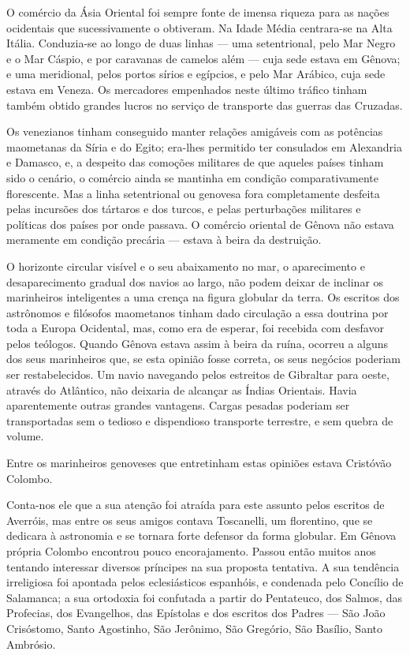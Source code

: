 \documentclass[11pt,a5paper,twoside,openany]{book}
\begin{document}
O comércio da Ásia Oriental foi sempre fonte de imensa riqueza para as nações ocidentais que sucessivamente o obtiveram. Na Idade Média centrara-se na Alta Itália. Conduzia-se ao longo de duas linhas — uma setentrional, pelo Mar Negro e o Mar Cáspio, e por caravanas de camelos além — cuja sede estava em Gênova; e uma meridional, pelos portos sírios e egípcios, e pelo Mar Arábico, cuja sede estava em Veneza. Os mercadores empenhados neste último tráfico tinham também obtido grandes lucros no serviço de transporte das guerras das Cruzadas.

Os venezianos tinham conseguido manter relações amigáveis com as potências maometanas da Síria e do Egito; era-lhes permitido ter consulados em Alexandria e Damasco, e, a despeito das comoções militares de que aqueles países tinham sido o cenário, o comércio ainda se mantinha em condição comparativamente florescente. Mas a linha setentrional ou genovesa fora completamente desfeita pelas incursões dos tártaros e dos turcos, e pelas perturbações militares e políticas dos países por onde passava. O comércio oriental de Gênova não estava meramente em condição precária — estava à beira da destruição.

O horizonte circular visível e o seu abaixamento no mar, o aparecimento e desaparecimento gradual dos navios ao largo, não podem deixar de inclinar os marinheiros inteligentes a uma crença na figura globular da terra. Os escritos dos astrônomos e filósofos maometanos tinham dado circulação a essa doutrina por toda a Europa Ocidental, mas, como era de esperar, foi recebida com desfavor pelos teólogos. Quando Gênova estava assim à beira da ruína, ocorreu a alguns dos seus marinheiros que, se esta opinião fosse correta, os seus negócios poderiam ser restabelecidos. Um navio navegando pelos estreitos de Gibraltar para oeste, através do Atlântico, não deixaria de alcançar as Índias Orientais. Havia aparentemente outras grandes vantagens. Cargas pesadas poderiam ser transportadas sem o tedioso e dispendioso transporte terrestre, e sem quebra de volume.

Entre os marinheiros genoveses que entretinham estas opiniões estava Cristóvão Colombo.

Conta-nos ele que a sua atenção foi atraída para este assunto pelos escritos de Averróis, mas entre os seus amigos contava Toscanelli, um florentino, que se dedicara à astronomia e se tornara forte defensor da forma globular. Em Gênova própria Colombo encontrou pouco encorajamento. Passou então muitos anos tentando interessar diversos príncipes na sua proposta tentativa. A sua tendência irreligiosa foi apontada pelos eclesiásticos espanhóis, e condenada pelo Concílio de Salamanca; a sua ortodoxia foi confutada a partir do Pentateuco, dos Salmos, das Profecias, dos Evangelhos, das Epístolas e dos escritos dos Padres — São João Crisóstomo, Santo Agostinho, São Jerônimo, São Gregório, São Basílio, Santo Ambrósio.
\end{document}
